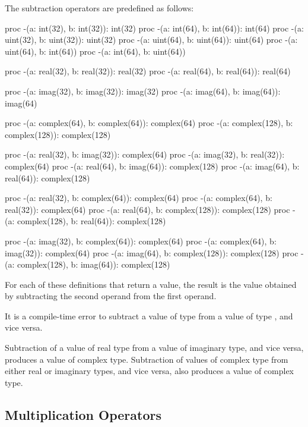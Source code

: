 The subtraction operators are predefined as follows:
\begin{chapel}
proc -(a: int(32), b: int(32)): int(32)
proc -(a: int(64), b: int(64)): int(64)
proc -(a: uint(32), b: uint(32)): uint(32)
proc -(a: uint(64), b: uint(64)): uint(64)
proc -(a: uint(64), b: int(64))
proc -(a: int(64), b: uint(64))

proc -(a: real(32), b: real(32)): real(32)
proc -(a: real(64), b: real(64)): real(64)

proc -(a: imag(32), b: imag(32)): imag(32)
proc -(a: imag(64), b: imag(64)): imag(64)

proc -(a: complex(64), b: complex(64)): complex(64)
proc -(a: complex(128), b: complex(128)): complex(128)

proc -(a: real(32), b: imag(32)): complex(64)
proc -(a: imag(32), b: real(32)): complex(64)
proc -(a: real(64), b: imag(64)): complex(128)
proc -(a: imag(64), b: real(64)): complex(128)

proc -(a: real(32), b: complex(64)): complex(64)
proc -(a: complex(64), b: real(32)): complex(64)
proc -(a: real(64), b: complex(128)): complex(128)
proc -(a: complex(128), b: real(64)): complex(128)

proc -(a: imag(32), b: complex(64)): complex(64)
proc -(a: complex(64), b: imag(32)): complex(64)
proc -(a: imag(64), b: complex(128)): complex(128)
proc -(a: complex(128), b: imag(64)): complex(128)
\end{chapel}
For each of these definitions that return a value, the result is the
value obtained by subtracting the second operand from the first
operand.

It is a compile-time error to subtract a value of type 
from a value of type , and vice versa.

Subtraction of a value of real type from a value of imaginary type,
and vice versa, produces a value of complex type.  Subtraction of
values of complex type from either real or imaginary types, and vice
versa, also produces a value of complex type.

\subsection{Multiplication Operators}
\label{Multiplication_Operators}

